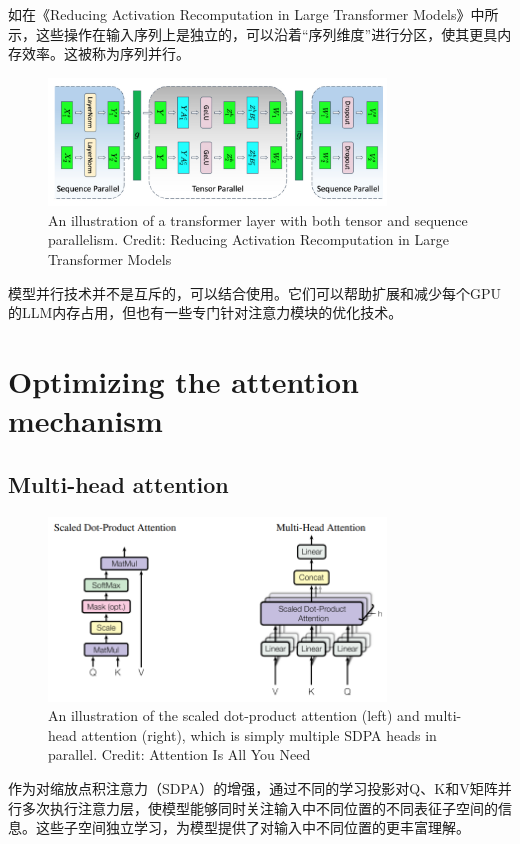 \documentclass[twocolumn, 10pt]{article} %
\theoremstyle{remark}
\begin{document}
如在《Reducing Activation Recomputation in Large Transformer Models》中所示，这些操作在输入序列上是独立的，可以沿着“序列维度”进行分区，使其更具内存效率。这被称为序列并行。

\begin{figure}[ht]
    \centering
    \includegraphics[width=0.8\textwidth]{transformer-layer-tensor-and-sequence-parallelism.png}
    \caption{An illustration of a transformer layer with both tensor and sequence parallelism. Credit: Reducing Activation Recomputation in Large Transformer Models}
\end{figure}

模型并行技术并不是互斥的，可以结合使用。它们可以帮助扩展和减少每个GPU的LLM内存占用，但也有一些专门针对注意力模块的优化技术。





\section{Optimizing the attention mechanism}


\subsection{Multi-head attention}
\begin{figure}[ht]
    \centering
    \includegraphics[width=0.8\textwidth]{scaled-dot-product-attention-and-multi-head-attention.png}
    \caption{An illustration of the scaled dot-product attention (left) and multi-head attention (right), which is simply multiple SDPA heads in parallel. Credit: Attention Is All You Need}
\end{figure}
作为对缩放点积注意力（SDPA）的增强，通过不同的学习投影对Q、K和V矩阵并行多次执行注意力层，使模型能够同时关注输入中不同位置的不同表征子空间的信息。这些子空间独立学习，为模型提供了对输入中不同位置的更丰富理解。
\end{document}
